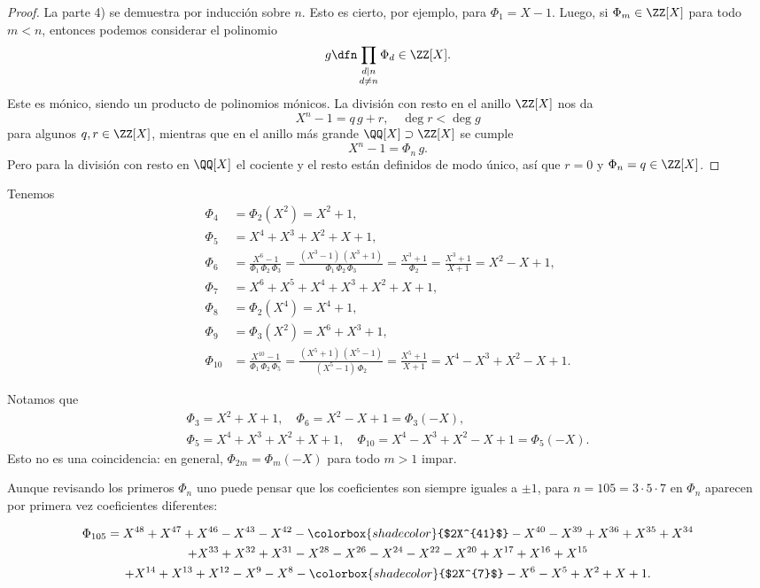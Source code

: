 \begin{teorema}
\begin{proof}
    La parte 4) se demuestra por inducción sobre $n$. Esto es cierto, por
    ejemplo, para $\Phi_1 = X-1$. Luego, si $\Phi_m \in \ZZ [X]$ para todo
    $m < n$, entonces podemos considerar el polinomio
    $$g \dfn \prod_{\substack{d\mid n \\ d\ne n}} \Phi_d \in \ZZ [X].$$
    Este es mónico, siendo un producto de polinomios mónicos. La división con
    resto en el anillo $\ZZ [X]$ nos da
    $$X^n - 1 = q\,g + r, \quad \deg r < \deg g$$
    para algunos $q, r \in \ZZ [X]$, mientras que en el anillo más grande
    $\QQ [X] \supset \ZZ [X]$ se cumple
    $$X^n - 1 = \Phi_n\,g.$$
    Pero para la división con resto en $\QQ [X]$ el cociente y el resto están
    definidos de modo único, así que $r = 0$ y $\Phi_n = q \in \ZZ[X]$.
  \end{proof}
\end{teorema}

\begin{ejemplo}
  Tenemos
  \begin{align*}
    \Phi_4 & = \Phi_2 (X^2) = X^2 + 1,\\
    \Phi_5 & = X^4 + X^3 + X^2 + X + 1,\\
    \Phi_6 & = \frac{X^6 - 1}{\Phi_1\,\Phi_2\,\Phi_3} = \frac{(X^3-1)\,(X^3+1)}{\Phi_1\,\Phi_2\,\Phi_3} = \frac{X^3+1}{\Phi_2} = \frac{X^3+1}{X+1} = X^2 - X + 1,\\
    \Phi_7 & = X^6 + X^5 + X^4 + X^3 + X^2 + X + 1,\\
    \Phi_8 & = \Phi_2 (X^4) = X^4 + 1,\\
    \Phi_9 & = \Phi_3 (X^2) = X^6 + X^3 + 1,\\
    \Phi_{10} & = \frac{X^{10}-1}{\Phi_1\,\Phi_2\,\Phi_5} = \frac{(X^5+1)\,(X^5-1)}{(X^5-1)\,\Phi_2} = \frac{X^5+1}{X+1} = X^4 - X^3 + X^2 - X + 1.
  \end{align*}

  Notamos que
  \begin{gather*}
    \Phi_3 = X^2 + X + 1, \quad \Phi_6 = X^2 - X + 1 = \Phi_3 (-X),\\
    \Phi_5 = X^4 + X^3 + X^2 + X + 1, \quad \Phi_{10} = X^4 - X^3 + X^2 - X + 1 = \Phi_5 (-X).
  \end{gather*}
  Esto no es una coincidencia: en general, $\Phi_{2m} = \Phi_m (-X)$ para todo
  $m > 1$ impar.
\end{ejemplo}

\begin{comentario}
  Aunque revisando los primeros $\Phi_n$ uno puede pensar que los coeficientes
  son siempre iguales a $\pm 1$, para $n = 105 = 3\cdot 5\cdot 7$ en $\Phi_n$
  aparecen por primera vez coeficientes diferentes:

  \begin{multline*}
    \Phi _{105} = X^{48}+X^{47}+X^{46}-X^{43}-X^{42}-\colorbox{shadecolor}{$2X^{41}$} -X^{40}-X^{39}+X^{36}+X^{35}+X^{34}\\
    +X^{33}+X^{32}+X^{31}-X^{28}-X^{26}-X^{24}-X^{22}-X^{20}+X^{17}+X^{16}+X^{15}\\
    +X^{14}+X^{13}+X^{12}-X^{9}-X^{8}-\colorbox{shadecolor}{$2X^{7}$}-X^{6}-X^{5}+X^{2}+X+1.
  \end{multline*}
\end{comentario}

